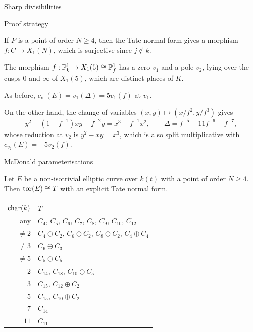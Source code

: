 \begin{frame}{Sharp divisibilities}
\end{frame}

\begin{frame}{Proof strategy}

If $ P $ is a point of order $ N \ge 4 $, then the Tate normal form gives a morphism $ f : C \to X_1(N) $, which is surjective since $ j \notin k $.

\begin{example}[$ K = k(t) $ and $ \tor(E) \cong C_5 $]
The morphism $ f : \P_k^1 \to X_1(5) \cong \P_f^1 $ has a zero $ v_1 $ and a pole $ v_2 $, lying over the cusps $ 0 $ and $ \infty $ of $ X_1(5) $, which are distinct places of $ K $.

\bigskip As before, $ c_{v_1}(E) = v_1(\Delta) = 5v_1(f) $ at $ v_1 $.

\bigskip On the other hand, the change of variables $ (x, y) \mapsto (x / f^2, y / f^3) $ gives
$$ y^2 - (1 - f^{-1})xy - f^{-2}y = x^3 - f^{-1}x^2, \qquad \Delta = f^{-5} - 11f^{-6} - f^{-7}, $$
whose reduction at $ v_2 $ is $ y^2 - xy = x^3 $, which is also split multiplicative with $ c_{v_2}(E) = -5v_2(f) $.
\end{example}

\end{frame}

\begin{frame}{McDonald parameterisations}

\begin{theorem}
Let $ E $ be a non-isotrivial elliptic curve over $ k(t) $ with a point of order $ N \ge 4 $. Then $ \tor(E) \cong T $ with an explicit Tate normal form.
\begin{center}
\begin{tabular}{|r|l|}
\hline
$ \ch(k) $ & $ T $ \\
\hline
any & $ C_4 $, $ C_5 $, $ C_6 $, $ C_7 $, $ C_8 $, $ C_9 $, $ C_{10} $, $ C_{12} $ \\
\hline
$ \ne 2 $ & $ C_4 \oplus C_2 $, $ C_6 \oplus C_2 $, $ C_8 \oplus C_2 $, $ C_4 \oplus C_4 $ \\
\hline
$ \ne 3 $ & $ C_6 \oplus C_3 $ \\
\hline
$ \ne 5 $ & $ C_5 \oplus C_5 $ \\
\hline
$ 2 $ & $ C_{14} $, $ C_{18} $, $ C_{10} \oplus C_5 $ \\
\hline
$ 3 $ & $ C_{15} $, $ C_{12} \oplus C_2 $ \\
\hline
$ 5 $ & $ C_{15} $, $ C_{10} \oplus C_2 $ \\
\hline
$ 7 $ & $ C_{14} $ \\
\hline
$ 11 $ & $ C_{11} $ \\
\hline
\end{tabular}
\end{center}
\end{theorem}

\end{frame}


